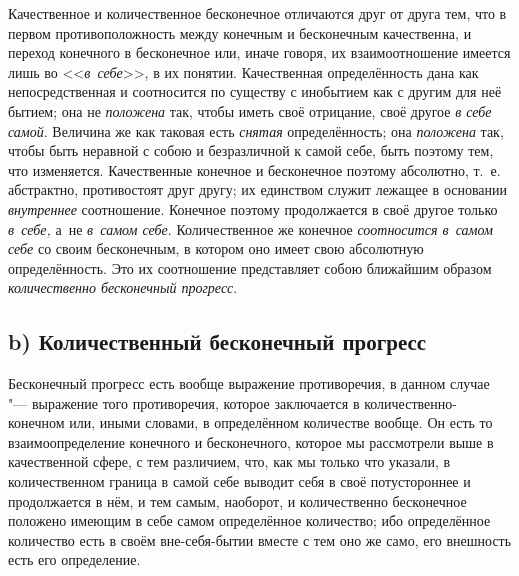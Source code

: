 Качественное и количественное бесконечное отличаются друг от друга тем, что
в первом противоположность между конечным и бесконечным качественна, и переход
конечного в бесконечное или, иначе говоря, их взаимоотношение имеется лишь во
<<{\em в~себе}>>, в их понятии. Качественная определённость дана как
непосредственная и соотносится по существу с инобытием как с другим для неё
бытием; она не {\em положена} так, чтобы иметь своё отрицание, своё другое
{\em в себе самой}. Величина же как таковая есть {\em снятая}
определённость; она {\em положена} так, чтобы быть неравной с собою и
безразличной к самой себе, быть поэтому тем, что изменяется. Качественные
конечное и бесконечное поэтому абсолютно, т.~е. абстрактно, противостоят друг
другу; их единством служит лежащее в основании {\em внутреннее} соотношение.
Конечное поэтому продолжается в своё другое только {\em в~себе,} а~не
{\em в~самом себе}. Количественное же конечное {\em соотносится в~самом себе}
со своим бесконечным, в котором оно имеет свою абсолютную определённость. Это
их соотношение представляет собою ближайшим образом
{\em количественно бесконечный прогресс}.

\subsection[b) Количественный бесконечный прогресс]%
{b) Количественный бесконечный прогресс}

Бесконечный прогресс есть вообще выражение противоречия, в данном случае "---
выражение того противоречия, которое заключается в количественно-конечном или,
иными словами, в определённом количестве вообще. Он есть то взаимоопределение
конечного и бесконечного, которое мы рассмотрели выше в качественной сфере,
с тем различием, что, как мы только что указали, в количественном граница
в самой себе выводит себя в своё потустороннее и продолжается в нём, и тем
самым, наоборот, и количественно бесконечное положено имеющим в себе самом
определённое количество; ибо определённое количество есть в своём
вне-себя-бытии вместе с тем оно же само, его внешность есть его определение.

